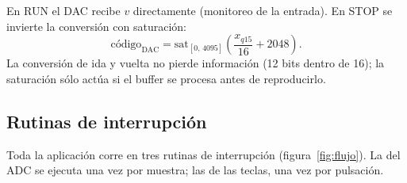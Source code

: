 \documentclass[11pt,a4paper]{article}
\begin{document}
En RUN el DAC recibe $v$ directamente (monitoreo de la entrada). En STOP se
invierte la conversión con saturación:
\begin{equation}
  \text{código}_{\text{DAC}} =
  \mathrm{sat}_{[0,\,4095]}\!\left(\frac{x_{q15}}{16} + 2048\right).
\end{equation}
La conversión de ida y vuelta no pierde información (12 bits dentro de 16);
la saturación sólo actúa si el buffer se procesa antes de reproducirlo.

\subsection{Rutinas de interrupción}

Toda la aplicación corre en tres rutinas de interrupción
(figura~\ref{fig:flujo}). La del ADC se ejecuta una vez por muestra; las de
las teclas, una vez por pulsación.
\end{document}
